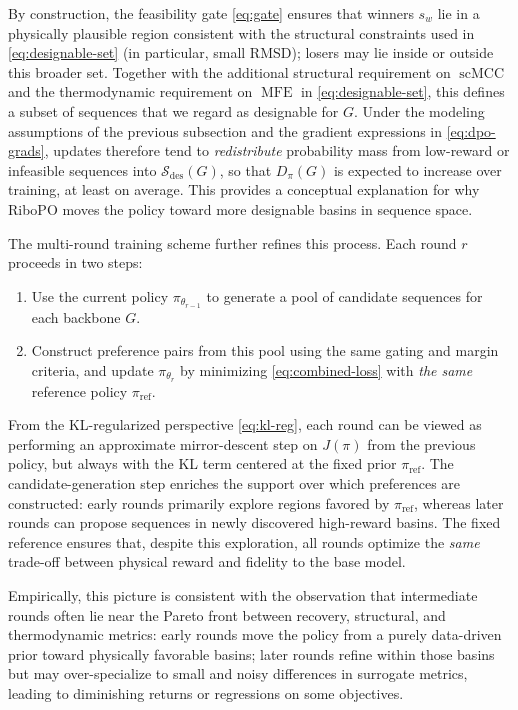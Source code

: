 {{By construction, the feasibility gate \eqref{eq:gate} ensures that winners
$s_w$ lie in a physically plausible region consistent with the structural
constraints used in \eqref{eq:designable-set} (in particular, small RMSD);
losers may lie inside or outside this broader set.
Together with the additional structural requirement on
$\operatorname{scMCC}$ and the thermodynamic requirement on $\operatorname{MFE}$
in \eqref{eq:designable-set}, this defines a subset of sequences that we
regard as designable for $G$.
Under the modeling assumptions of the previous subsection and the gradient
expressions in \eqref{eq:dpo-grads}, updates therefore tend to
\emph{redistribute} probability mass from low-reward or infeasible sequences
into $\mathcal{S}_{\text{des}}(G)$, so that $D_\pi(G)$ is expected to
increase over training, at least on average.
This provides a conceptual explanation for why RiboPO moves the policy toward
more designable basins in sequence space.

The multi-round training scheme further refines this process. Each round
$r$ proceeds in two steps:
\begin{enumerate}
    \item Use the current policy $\pi_{\theta_{r-1}}$ to generate a pool of
    candidate sequences for each backbone $G$.
    \item Construct preference pairs from this pool using the same gating and
    margin criteria, and update $\pi_{\theta_r}$ by minimizing
    \eqref{eq:combined-loss} with \emph{the same} reference policy
    $\pi_{\text{ref}}$.
\end{enumerate}
From the KL-regularized perspective \eqref{eq:kl-reg}, each round can be
viewed as performing an approximate mirror-descent step on $J(\pi)$ from
the previous policy, but always with the KL term centered at the fixed
prior $\pi_{\text{ref}}$. The candidate-generation step enriches the support
over which preferences are constructed: early rounds primarily explore
regions favored by $\pi_{\text{ref}}$, whereas later rounds can propose
sequences in newly discovered high-reward basins. The fixed reference
ensures that, despite this exploration, all rounds optimize the \emph{same}
trade-off between physical reward and fidelity to the base model.

Empirically, this picture is consistent with the observation that intermediate
rounds often lie near the Pareto front between recovery, structural, and
thermodynamic metrics: early rounds move the policy from a purely
data-driven prior toward physically favorable basins; later rounds refine
within those basins but may over-specialize to small and noisy differences
in surrogate metrics, leading to diminishing returns or regressions on some
objectives.

}}
